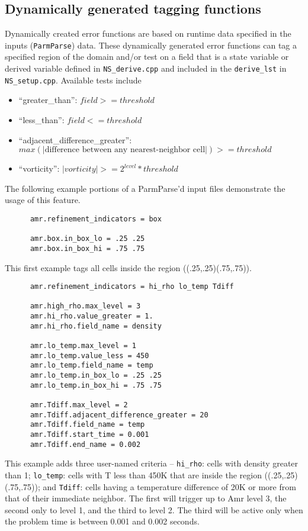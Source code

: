 \subsection{Dynamically generated tagging functions}
Dynamically created error functions are based on runtime data specified in the
inputs ({\tt ParmParse}) data.
These dynamically generated error functions can tag a specified region of the domain and/or test on a field
that is a state variable
or derived variable defined in {\tt NS\_derive.cpp} and included in the {\tt derive\_lst} in {\tt NS\_setup.cpp}.
Available tests include
\begin{itemize}
\item ``greater\_than'': $field >= threshold$
\item ``less\_than'': $field <= threshold$
\item ``adjacent\_difference\_greater'': $max( | \text{difference between any nearest-neighbor cell} | ) >= threshold$
\item ``vorticity'': $ |vorticity| >= 2^{level} * threshold$
\end{itemize}

The following example portions of a ParmParse'd input files demonstrate the usage of this feature.
\begin{verbatim}
      amr.refinement_indicators = box

      amr.box.in_box_lo = .25 .25
      amr.box.in_box_hi = .75 .75
\end{verbatim}
This first example tags all cells inside the region ((.25,.25)(.75,.75)).
\begin{verbatim}
      amr.refinement_indicators = hi_rho lo_temp Tdiff

      amr.high_rho.max_level = 3
      amr.hi_rho.value_greater = 1.
      amr.hi_rho.field_name = density

      amr.lo_temp.max_level = 1
      amr.lo_temp.value_less = 450
      amr.lo_temp.field_name = temp
      amr.lo_temp.in_box_lo = .25 .25
      amr.lo_temp.in_box_hi = .75 .75

      amr.Tdiff.max_level = 2
      amr.Tdiff.adjacent_difference_greater = 20
      amr.Tdiff.field_name = temp
      amr.Tdiff.start_time = 0.001
      amr.Tdiff.end_name = 0.002
\end{verbatim}
This example adds three user-named criteria -- 
{\tt hi\_rho}: cells with density greater than 1;
{\tt lo\_temp}: cells with T less than 450K that are inside the region ((.25,.25)(.75,.75));
and {\tt Tdiff}: cells having a temperature difference of 20K
or more from that of their
immediate neighbor.  The first will trigger up to Amr level 3, the second only to level 1, and the third to level 2.
The third will be active only when the problem time is between 0.001 and 0.002 seconds.

